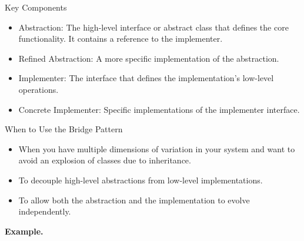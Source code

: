 Key Components

\begin{itemize}
\item Abstraction: The high-level interface or abstract class that defines the core functionality. It contains a reference to the implementer.

\item Refined Abstraction: A more specific implementation of the abstraction.

\item Implementer: The interface that defines the implementation's low-level operations.

\item Concrete Implementer: Specific implementations of the implementer interface.
\end{itemize}

When to Use the Bridge Pattern

\begin{itemize}
\item When you have multiple dimensions of variation in your system and want to avoid an explosion of classes due to inheritance.

\item To decouple high-level abstractions from low-level implementations.

\item To allow both the abstraction and the implementation to evolve independently.
\end{itemize}

\textbf{Example.}

